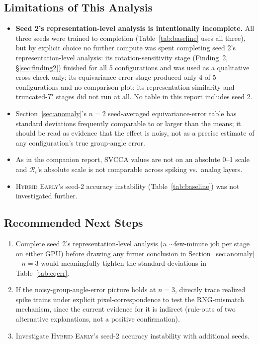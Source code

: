 \documentclass[11pt]{article}
\newcommand{\HybridEarly}{\textsc{Hybrid Early}}
\begin{document}
\subsection{Limitations of This Analysis}
\begin{itemize}[leftmargin=1.5em]
\item \textbf{Seed 2's representation-level analysis is intentionally incomplete.} All three seeds
were trained to completion (Table~\ref{tab:baseline} uses all three), but by explicit choice no
further compute was spent completing seed 2's representation-level analysis: its rotation-sensitivity
stage (Finding~2, \S\ref{sec:finding2}) finished for all 5 configurations and was used as a qualitative
cross-check only; its equivariance-error stage produced only 4 of 5 configurations and no comparison
plot; its representation-similarity and truncated-$T'$ stages did not run at all. No table in this
report includes seed 2.
\item Section~\ref{sec:anomaly}'s $n=2$ seed-averaged equivariance-error table has standard deviations
frequently comparable to or larger than the means; it should be read as evidence that the effect is
noisy, not as a precise estimate of any configuration's true group-angle error.
\item As in the companion report, SVCCA values are not on an absolute 0--1 scale and $\mathcal{R}_i$'s
absolute scale is not comparable across spiking vs.\ analog layers.
\item \HybridEarly's seed-2 accuracy instability (Table~\ref{tab:baseline}) was not investigated
further.
\end{itemize}

\subsection{Recommended Next Steps}
\begin{enumerate}[leftmargin=1.5em]
\item Complete seed 2's representation-level analysis (a $\sim$few-minute job per stage on either
GPU) before drawing any firmer conclusion in Section~\ref{sec:anomaly} -- $n=3$ would meaningfully
tighten the standard deviations in Table~\ref{tab:eqerr}.
\item If the noisy-group-angle-error picture holds at $n=3$, directly trace realized spike trains
under explicit pixel-correspondence to test the RNG-mismatch mechanism, since the current evidence for
it is indirect (rule-outs of two alternative explanations, not a positive confirmation).
\item Investigate \HybridEarly's seed-2 accuracy instability with additional seeds.
\end{enumerate}
\end{document}
